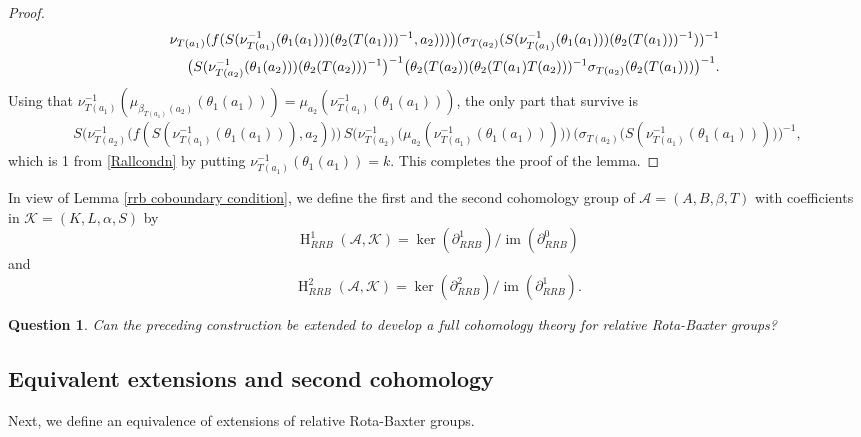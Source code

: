 \documentclass[11pt]{amsart}
\theoremstyle{thrm}
\theoremstyle{plain}
\newtheorem{question}[thm]{Question}
\theoremstyle{definition}
\newcommand{\Ho}{\operatorname{H} }
\newcommand{\Ker}{\operatorname{ker} }
\newcommand{\IM}{\operatorname{im} }
\numberwithin{equation}{section}
\begin{document}
\begin{proof}
\begin{eqnarray*}
		&&  \nu_{T(a_1)}(f(S(\nu^{-1}_{T(a_1)}(\theta_1(a_1)))(\theta_2(T(a_1)))^{-1}, a_2 ))) \big)  (\sigma_{T(a_2)}(S(\nu^{-1}_{T(a_1)}(\theta_1(a_1)))(\theta_2(T(a_1)))^{-1}))^{-1}\notag\\   
		&&	\big(S(\nu^{-1}_{T(a_2)}(\theta_1(a_2)))(\theta_2(T(a_2)))^{-1}\big)^{-1} \big( \theta_2(T(a_2))(\theta_2(T(a_1) T(a_2)))^{-1}\sigma_{T(a_2)}(\theta_2(T(a_1))) \big)^{-1}.
	\end{eqnarray*}
	Using that $\nu^{-1}_{T(a_1)}(\mu_{\beta_{T(a_1)}(a_2)}(\theta_1(a_1)))= \mu_{a_2}(\nu^{-1}_{T(a_1)}(\theta_1(a_1)))$, the only part that survive is  
	\begin{align*}
		S\big(\nu^{-1}_{T(a_2)} \big(f(S(\nu^{-1}_{T(a_1)}(\theta_1(a_1))), a_2) \big)\big)\, S\big(\nu^{-1}_{T(a_2)} \big(\mu_{a_2}(\nu^{-1}_{T(a_1)}(\theta_1(a_1))) \big)\big) \,\big(\sigma_{T(a_2)} \big(S(\nu^{-1}_{T(a_1)}(\theta_1(a_1))) \big)\big)^{-1},
	\end{align*}
	which is 1 from \eqref{Rallcondn}  by putting $\nu^{-1}_{T(a_1)}(\theta_1(a_1))=k$. This completes the proof of the lemma.
\end{proof}

In view of Lemma \ref{rrb coboundary condition}, we define the first and the second cohomology group of $\mathcal{A}=(A, B, \beta, T)$  with coefficients in $\mathcal{K}=(K, L, \alpha, S)$ by $$\Ho^1_{RRB}(\mathcal{A}, \mathcal{K})=\Ker(\partial^1_{RRB})/  \IM(\partial^0_{RRB})$$
and $$\Ho^2_{RRB}(\mathcal{A}, \mathcal{K})=\Ker(\partial^2_{RRB})/  \IM(\partial^1_{RRB}).$$

\begin{question}
	Can the preceding construction be extended to develop a full cohomology theory for relative Rota-Baxter groups?
\end{question}

\medskip


\subsection{Equivalent extensions and second cohomology}\label{subsec equivalent extensions and cohomology}
Next, we define an equivalence of extensions of relative Rota-Baxter groups.
\end{document}
